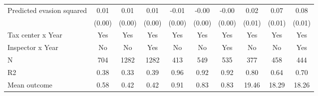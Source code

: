 \begin{tabular}{lccc|ccc|ccc}
\addlinespace
Predicted evasion squared&        0.01\sym{***}&        0.01\sym{***}&        0.01\sym{***}&       -0.01\sym{***}&       -0.00\sym{***}&       -0.00\sym{***}&        0.02         &        0.07\sym{***}&        0.08\sym{***}\\
            &      (0.00)         &      (0.00)         &      (0.00)         &      (0.00)         &      (0.00)         &      (0.00)         &      (0.01)         &      (0.01)         &      (0.01)         \\
\midrule
Tax center x Year&         Yes         &         Yes         &         Yes         &         Yes         &         Yes         &         Yes         &         Yes         &         Yes         &         Yes         \\
Inspector x Year&          No         &          No         &         Yes         &          No         &          No         &         Yes         &          No         &          No         &         Yes         \\
N           &         704         &        1282         &        1282         &         413         &         549         &         535         &         377         &         458         &         444         \\
R2          &        0.38         &        0.33         &        0.39         &        0.96         &        0.92         &        0.92         &        0.80         &        0.64         &        0.70         \\
Mean outcome&        0.58         &        0.42         &        0.42         &        0.91         &        0.83         &        0.83         &       19.46         &       18.29         &       18.26         \\
\bottomrule \end{tabular}
